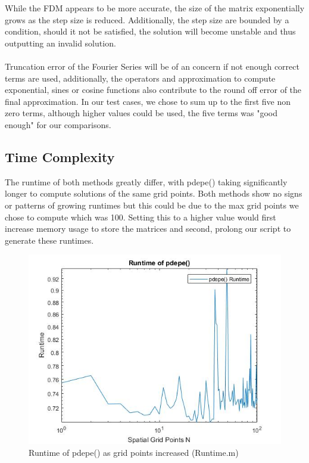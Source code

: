 \documentclass{article}
\begin{document}
\noindent While the FDM appears to be more accurate, the size of the matrix exponentially grows as the step size is reduced. Additionally, the step size are bounded by a condition, should it not be satisfied, the solution will become unstable and thus outputting an invalid solution.
\\
\\
Truncation error of the Fourier Series will be of an concern if not enough correct terms are used, additionally, the operators and approximation to compute exponential, sines or cosine functions also contribute to the round off error of the final approximation. In our test cases, we chose to sum up to the first five non zero terms, although higher values could be used, the five terms was "good enough" for our comparisons.
\newpage
\subsection{Time Complexity}
The runtime of both methods greatly differ, with pdepe() taking significantly longer to compute solutions of the same grid points. Both methods show no signs or patterns of growing runtimes but this could be due to the max grid points we chose to compute which was 100. Setting this to a higher value would first increase memory usage to store the matrices and second, prolong our script to generate these runtimes.
\begin{figure}[hp]
	\begin{center}
		\includegraphics[width=\textwidth,height=\textheight,keepaspectratio]{MATLAB/pdepeRuntime.jpg}
	\end{center}
	\caption{Runtime of pdepe() as grid points increased (Runtime.m)}
\end{figure}
\end{document}
